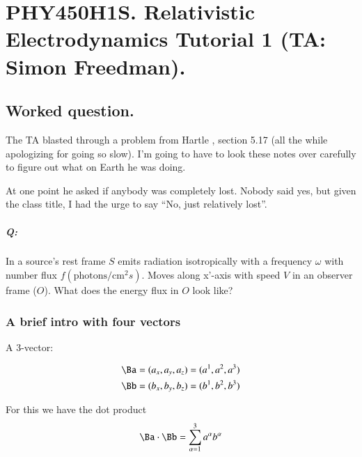 %
%

\chapter{PHY450H1S.  Relativistic Electrodynamics Tutorial 1 (TA: Simon Freedman).}
\label{chap:relativisticElectrodynamicsT1}
{}
\date{Jan 20, 2011}

\beginArtNoToc

\section{Worked question.}

The TA blasted through a problem from Hartle \cite{hartle2003gravity}, section 5.17 (all the while apologizing for going so slow).  I'm going to have to look these notes over carefully to figure out what on Earth he was doing.

At one point he asked if anybody was completely lost.  Nobody said yes, but given the class title, I had the urge to say ``No, just relatively lost''.

\paragraph{Q:}
In a source's rest frame $S$ emits radiation isotropically with a frequency $\omega$ with number flux $f(\text{photons}/\text{cm}^2 s)$.  Moves along x'-axis with speed $V$ in an observer frame ($O$).  What does the energy flux in $O$ look like?

\subsection{A brief intro with four vectors}

A 3-vector: 

\begin{align}\label{eqn:relativisticElectrodynamicsT1:10}
\Ba &= (a_x, a_y, a_z) = (a^1, a^2, a^3) \\
\Bb &= (b_x, b_y, b_z) = (b^1, b^2, b^3)
\end{align}

For this we have the dot product
\begin{equation}\label{eqn:relativisticElectrodynamicsT1:20}
\Ba \cdot \Bb = \sum_{\alpha=1}^3 a^\alpha b^\alpha
\end{equation}

